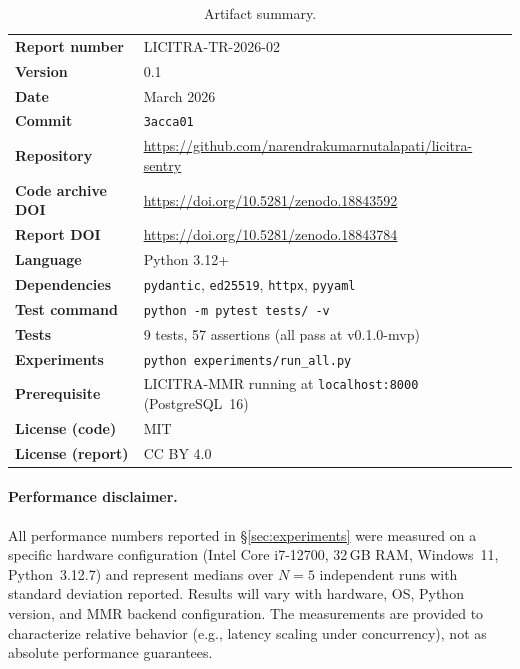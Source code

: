 \documentclass[11pt,a4paper]{article}
\begin{document}
\begin{table}[ht]
\centering
\caption{Artifact summary.}
\label{tab:artifact}
\begin{tabular}{@{}ll@{}}
\toprule
\textbf{Report number} & LICITRA-TR-2026-02 \\
\textbf{Version}     & 0.1 \\
\textbf{Date}        & March 2026 \\
\textbf{Commit}      & \texttt{3acca01} \\
\textbf{Repository}  & \url{https://github.com/narendrakumarnutalapati/licitra-sentry} \\
\textbf{Code archive DOI} & \url{https://doi.org/10.5281/zenodo.18843592} \\
\textbf{Report DOI}  & \url{https://doi.org/10.5281/zenodo.18843784} \\
\textbf{Language}    & Python 3.12+ \\
\textbf{Dependencies} & \texttt{pydantic}, \texttt{ed25519}, \texttt{httpx}, \texttt{pyyaml} \\
\textbf{Test command} & \texttt{python -m pytest tests/ -v} \\
\textbf{Tests}       & 9 tests, 57 assertions (all pass at v0.1.0-mvp) \\
\textbf{Experiments} & \texttt{python experiments/run\_all.py} \\
\textbf{Prerequisite} & LICITRA-MMR running at \texttt{localhost:8000} (PostgreSQL~16) \\
\textbf{License (code)} & MIT \\
\textbf{License (report)} & CC BY 4.0 \\
\bottomrule
\end{tabular}
\end{table}

\paragraph{Performance disclaimer.}
All performance numbers reported in \S\ref{sec:experiments} were measured on a specific hardware
configuration (Intel Core i7-12700, 32\,GB RAM, Windows~11, Python~3.12.7) and represent
medians over $N=5$ independent runs with standard deviation reported. Results will vary with
hardware, OS, Python version, and MMR backend configuration. The measurements are provided to
characterize relative behavior (e.g., latency scaling under concurrency), not as absolute
performance guarantees.


\end{document}
